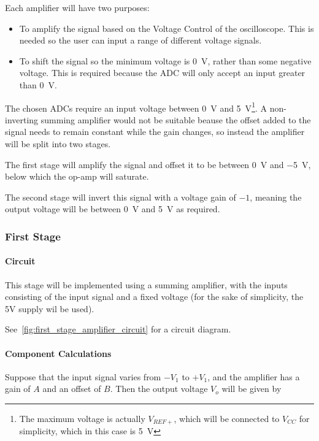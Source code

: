 Each amplifier will have two purposes:
\begin{itemize}
  \item To amplify the signal based on the Voltage Control of the oscilloscope.
    This is needed so the user can input a range of different voltage signals.

  \item To shift the signal so the minimum voltage is \SI{0}{\volt}, rather
    than some negative voltage. This is required because the ADC will only
    accept an input greater than \SI{0}{\volt}.
\end{itemize}

The chosen ADCs require an input voltage between \SI{0}{\volt} and
\SI{5}{\volt}\footnote{The maximum voltage is actually $V_{REF+}$, which will be
connected to $V_{CC}$ for simplicity, which in this case is \SI{5}{\volt}}. A
non-inverting summing amplifier would not be suitable beause the offset added to
the signal needs to remain constant while the gain changes, so instead the
amplifier will be split into two stages.

The first stage will amplify the signal and offset it to be between
\SI{0}{\volt} and \SI{-5}{\volt}, below which the op-amp will saturate.

The second stage will invert this signal with a voltage gain of $-1$, meaning
the output voltage will be between \SI{0}{\volt} and \SI{5}{\volt} as required.

\subsubsection{First Stage}

\paragraph{Circuit}
This stage will be implemented using a summing amplifier, with the inputs
consisting of the input signal and a fixed voltage (for the sake of simplicity,
the 5V supply wil be used).

See~\cref{fig:first_stage_amplifier_circuit} for a circuit diagram.

\paragraph{Component Calculations}

Suppose that the input signal varies from $-V_1$ to $+V_1$, and the amplifier
has a gain of $A$ and an offset of $B$. Then the output voltage $V_o$ will be
given by


